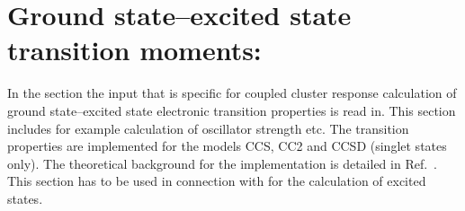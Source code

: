 
\section{Ground state--excited state transition moments: }
\label{sec:cclrsd}


In the  section the input that is
specific for coupled cluster response calculation of ground state--excited state
electronic transition properties is read in.
This section includes for example calculation of oscillator strength etc.
The transition properties are implemented for the models CCS, CC2 and CCSD
(singlet states only).
The theoretical background for the implementation is detailed in Ref.\ \cite{Christiansen:CCLR,Christiansen:QEL}.
This section  has to be used in connection with  
for the calculation of excited states.

\begin{center}
\end{center}

